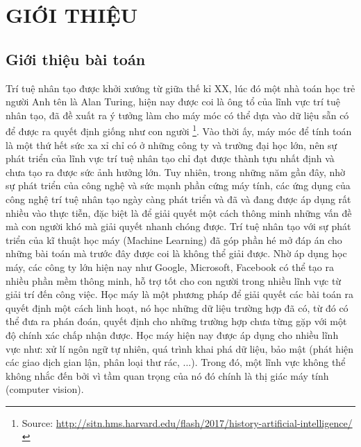 \chapter{GIỚI THIỆU}
\label{introduction}
\section{Giới thiệu bài toán}
Trí tuệ nhân tạo được khởi xướng từ giữa thế kỉ XX, lúc đó một nhà toán học trẻ người Anh tên là Alan Turing, hiện nay được coi là ông tổ của lĩnh vực trí tuệ nhân tạo, đã đề xuất ra ý tưởng làm cho máy móc có thể dựa vào dữ liệu sẵn có để được ra quyết định giống như con người \footnote{Source: \url{http://sitn.hms.harvard.edu/flash/2017/history-artificial-intelligence/}}. Vào thời ấy, máy móc để tính toán là một thứ hết sức xa xỉ chỉ có ở những công ty và trường đại học lớn, nên sự phát triển của lĩnh vực trí tuệ nhân tạo chỉ đạt được thành tựu nhất định và chưa tạo ra được sức ảnh hưởng lớn. Tuy nhiên, trong những năm gần đây, nhờ sự phát triển của công nghệ và sức mạnh phần cứng máy tính, các ứng dụng của công nghệ trí tuệ nhân tạo ngày càng phát triển và đã và đang được áp dụng rất nhiều vào thực tiễn, đặc biệt là để giải quyết một cách thông minh những vấn đề mà con người khó mà giải quyết nhanh chóng được. Trí tuệ nhân tạo với sự phát triển của kĩ thuật học máy (Machine Learning) đã góp phần hé mở đáp án cho những bài toán mà trước đây được coi là không thể giải được. Nhờ áp dụng học máy, các công ty lớn hiện nay như Google, Microsoft, Facebook có thể tạo ra nhiều phần mềm thông minh, hỗ trợ tốt cho con người trong nhiều lĩnh vực từ giải trí đến công việc. Học máy là một phương pháp để giải quyết các bài toán ra quyết định một cách linh hoạt, nó học những dữ liệu trường hợp đã có, từ đó có thể đưa ra phán đoán, quyết định cho những trường hợp chưa từng gặp với một độ chính xác chấp nhận được. Học máy hiện nay được áp dụng cho nhiều lĩnh vực như: xử lí ngôn ngữ tự nhiên, quá trình khai phá dữ liệu, bảo mật (phát hiện các giao dịch gian lận, phân loại thư rác, ...). Trong đó, một lĩnh vực không thể không nhắc đến bởi vì tầm quan trọng của nó đó chính là thị giác máy tính (computer vision).

